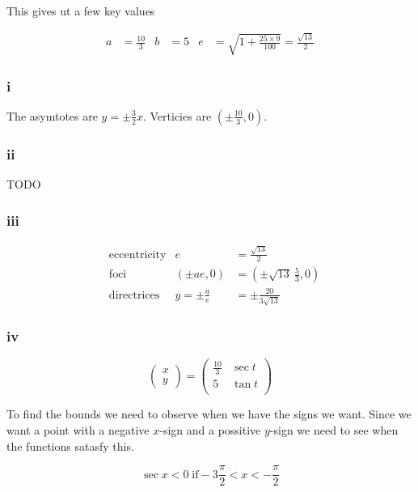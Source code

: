 \documentclass{article}
\begin{document}
This gives ut a few key values

\begin{align*}
	a & = \frac {10}3 & b & = 5 & e & = \sqrt {1 + \frac {25\times9}{100}} = \frac {\sqrt{13}}{2}
\end{align*}

\subsubsection {i}

The asymtotes are $y = \pm \frac {3} {2}x$. Verticies are $(\pm \frac {10}3, 0)$.

\subsubsection {ii}

TODO

\subsubsection{iii}

\begin{align*}
	 & \mathrm{eccentricity} & e               & = \frac {\sqrt {13}}2            \\
	 & \mathrm{foci}         & (\pm ae, 0)     & = (\pm\sqrt {13}~ \frac {5} 3,0) \\
	 & \mathrm{directrices}  & y = \pm\frac ae & = \pm \frac {20} {3\sqrt {13}}
\end{align*}

\subsubsection{iv}

$$
	\begin{pmatrix}
		x \\ y
	\end{pmatrix}
	=
	\begin{pmatrix}
		\frac {10}3 & \sec t \\
		5           & \tan t \\
	\end{pmatrix}
$$

To find the bounds we need to observe when we have the signs we want. Since we want a point with a negative $x$-sign and a possitive $y$-sign we need to see when the functions satasfy this.

$$\sec x < 0 \;\mathrm{if} -3\frac \pi 2 < x < - \frac \pi 2$$
\end{document}

